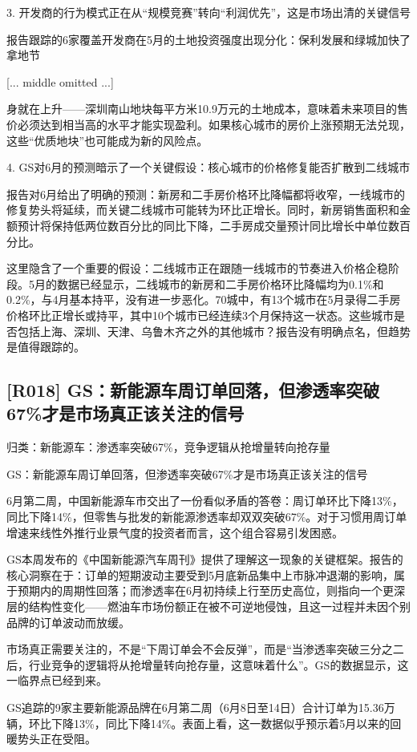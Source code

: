 \documentclass[11pt]{ctexart}
\begin{document}
3. 开发商的行为模式正在从“规模竞赛”转向“利润优先”，这是市场出清的关键信号

报告跟踪的6家覆盖开发商在5月的土地投资强度出现分化：保利发展和绿城加快了拿地节

[... middle omitted ...]

身就在上升——深圳南山地块每平方米10.9万元的土地成本，意味着未来项目的售价必须达到相当高的水平才能实现盈利。如果核心城市的房价上涨预期无法兑现，这些“优质地块”也可能成为新的风险点。

4. GS对6月的预测暗示了一个关键假设：核心城市的价格修复能否扩散到二线城市

报告对6月给出了明确的预测：新房和二手房价格环比降幅都将收窄，一线城市的修复势头将延续，而关键二线城市可能转为环比正增长。同时，新房销售面积和金额预计将保持低两位数百分比的同比下降，二手房成交量预计同比增长中单位数百分比。

这里隐含了一个重要的假设：二线城市正在跟随一线城市的节奏进入价格企稳阶段。5月的数据已经显示，二线城市的新房和二手房价格环比降幅均为0.1\%和0.2\%，与4月基本持平，没有进一步恶化。70城中，有13个城市在5月录得二手房价格环比正增长或持平，其中10个城市已经连续3个月保持这一状态。这些城市是否包括上海、深圳、天津、乌鲁木齐之外的其他城市？报告没有明确点名，但趋势是值得跟踪的。

\subsection{[R018] GS：新能源车周订单回落，但渗透率突破67\%才是市场真正该关注的信号}
{\small\color{refgray}归类：新能源车：渗透率突破67\%，竞争逻辑从抢增量转向抢存量}

GS：新能源车周订单回落，但渗透率突破67\%才是市场真正该关注的信号

6月第二周，中国新能源车市交出了一份看似矛盾的答卷：周订单环比下降13\%，同比下降14\%，但零售与批发的新能源渗透率却双双突破67\%。对于习惯用周订单增速来线性外推行业景气度的投资者而言，这个组合容易引发困惑。

GS本周发布的《中国新能源汽车周刊》提供了理解这一现象的关键框架。报告的核心洞察在于：订单的短期波动主要受到5月底新品集中上市脉冲退潮的影响，属于预期内的周期性回落；而渗透率在6月初持续上行至历史高位，则指向一个更深层的结构性变化——燃油车市场份额正在被不可逆地侵蚀，且这一过程并未因个别品牌的订单波动而放缓。

市场真正需要关注的，不是“下周订单会不会反弹”，而是“当渗透率突破三分之二后，行业竞争的逻辑将从抢增量转向抢存量，这意味着什么”。GS的数据显示，这一临界点已经到来。

GS追踪的9家主要新能源品牌在6月第二周（6月8日至14日）合计订单为15.36万辆，环比下降13\%，同比下降14\%。表面上看，这一数据似乎预示着5月以来的回暖势头正在受阻。
\end{document}
